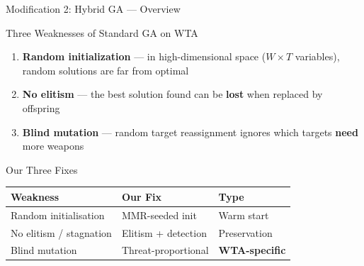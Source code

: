 \documentclass[aspectratio=169,10pt]{beamer}
\begin{document}
\begin{frame}[shrink=3]{Modification 2: Hybrid GA --- Overview}

  \begin{block}{Three Weaknesses of Standard GA on WTA}
    \small
    \begin{enumerate}\setlength\itemsep{3pt}
      \item \textbf{Random initialization} --- in high-dimensional space
            ($W \times T$ variables), random solutions are far from optimal
      \item \textbf{No elitism} --- the best solution found can be \textbf{lost}
            when replaced by offspring
      \item \textbf{Blind mutation} --- random target reassignment ignores which
            targets \textbf{need} more weapons
    \end{enumerate}
  \end{block}

  \vspace{0.2cm}

  \begin{alertblock}{Our Three Fixes}
    \vspace{3pt}
    \begin{center}
    \small
    \setlength{\tabcolsep}{9pt}
    \renewcommand{\arraystretch}{1.3}
    \begin{tabular}{lll}
      \toprule
      \textbf{Weakness}        & \textbf{Our Fix}        & \textbf{Type}         \\
      \midrule
      Random initialisation    & MMR-seeded init         & Warm start            \\
      No elitism / stagnation  & Elitism + detection     & Preservation          \\
      Blind mutation           & Threat-proportional     & \textbf{WTA-specific} \\
      \bottomrule
    \end{tabular}
    \end{center}
    \vspace{2pt}
  \end{alertblock}

\end{frame}


\end{document}
